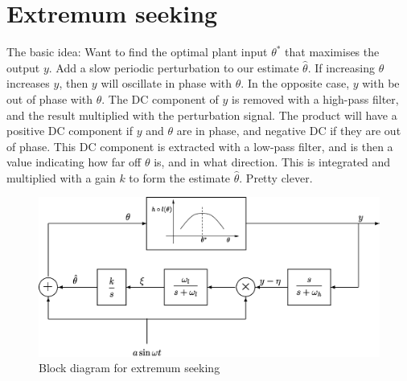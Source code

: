 \section{Extremum seeking}
The basic idea: Want to find the optimal plant input $\theta^*$ that maximises the output $y$. Add a slow periodic perturbation to our estimate $\hat{\theta}$. If increasing $\theta$ increases $y$, then $y$ will oscillate in phase with $\theta$. In the opposite case, $y$ with be out of phase with $\theta$. The DC component of $y$ is removed with a high-pass filter, and the result multiplied with the perturbation signal. The product will have a positive DC component if $y$ and $\theta$ are in phase, and negative DC if they are out of phase. This DC component is extracted with a low-pass filter, and is then a value indicating how far off $\theta$ is, and in what direction. This is integrated and multiplied with a gain $k$ to form the estimate $\hat{\theta}$. Pretty clever.

\begin{figure}[htbp]
\begin{center}
	\includegraphics[width = \textwidth]{extremum-seeking}
	\caption{Block diagram for extremum seeking}
	\label{fig:MRAC}
\end{center}
\end{figure}